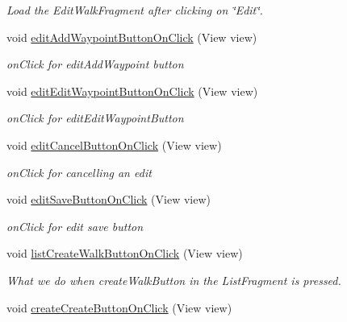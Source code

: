 \begin{DoxyCompactItemize}
\begin{DoxyCompactList}\small\item\em Load the Edit\+Walk\+Fragment after clicking on \char`\"{}\+Edit\char`\"{}. \end{DoxyCompactList}\item 
void \hyperlink{classuk_1_1ac_1_1swan_1_1digitaltrails_1_1activities_1_1_my_walks_activity_a0accd4644e769980f1d0b58eb14c4c2a}{edit\+Add\+Waypoint\+Button\+On\+Click} (View view)
\begin{DoxyCompactList}\small\item\em on\+Click for edit\+Add\+Waypoint button \end{DoxyCompactList}\item 
void \hyperlink{classuk_1_1ac_1_1swan_1_1digitaltrails_1_1activities_1_1_my_walks_activity_a1c0ee44792113ce063d822a47d074292}{edit\+Edit\+Waypoint\+Button\+On\+Click} (View view)
\begin{DoxyCompactList}\small\item\em on\+Click for edit\+Edit\+Waypoint\+Button \end{DoxyCompactList}\item 
void \hyperlink{classuk_1_1ac_1_1swan_1_1digitaltrails_1_1activities_1_1_my_walks_activity_a87917a8865cbcfb25fcb2153a15fc4d8}{edit\+Cancel\+Button\+On\+Click} (View view)
\begin{DoxyCompactList}\small\item\em on\+Click for cancelling an edit \end{DoxyCompactList}\item 
void \hyperlink{classuk_1_1ac_1_1swan_1_1digitaltrails_1_1activities_1_1_my_walks_activity_ab61b2dcee297cc8bff9caac74f1233d1}{edit\+Save\+Button\+On\+Click} (View view)
\begin{DoxyCompactList}\small\item\em on\+Click for edit save button \end{DoxyCompactList}\item 
void \hyperlink{classuk_1_1ac_1_1swan_1_1digitaltrails_1_1activities_1_1_my_walks_activity_ac4f5e32e546828e89cc6c99c8fe747fa}{list\+Create\+Walk\+Button\+On\+Click} (View view)
\begin{DoxyCompactList}\small\item\em What we do when create\+Walk\+Button in the List\+Fragment is pressed. \end{DoxyCompactList}\item 
void \hyperlink{classuk_1_1ac_1_1swan_1_1digitaltrails_1_1activities_1_1_my_walks_activity_ab4000a31ea23ae6d7b5474186bd4cd9d}{create\+Create\+Button\+On\+Click} (View view)

\end{DoxyCompactItemize}
